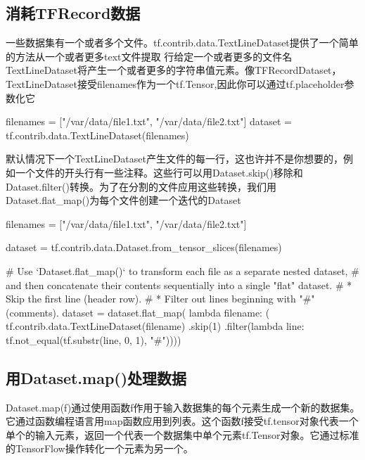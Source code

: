 \subsection{消耗TFRecord数据}
一些数据集有一个或者多个文件。tf.contrib.data.TextLineDataset提供了一个简单的方法从一个或者更多text文件提取
行给定一个或者更多的文件名TextLineDataset将产生一个或者更多的字符串值元素。像TFRecordDataset，TextLineDataset接受filenames作为一个tf.Tensor,因此你可以通过tf.placeholder参数化它
\begin{python}
filenames = ["/var/data/file1.txt", "/var/data/file2.txt"]
dataset = tf.contrib.data.TextLineDataset(filenames)
\end{python}
默认情况下一个TextLineDataset产生文件的每一行，这也许并不是你想要的，例如一个文件的开头行有一些注释。这些行可以用Dataset.skip()移除和Dataset.filter()转换。为了在分割的文件应用这些转换，我们用Dataset.flat\_map()为每个文件创建一个迭代的Dataset
\begin{python}
filenames = ["/var/data/file1.txt", "/var/data/file2.txt"]

dataset = tf.contrib.data.Dataset.from_tensor_slices(filenames)

# Use `Dataset.flat\_map()` to transform each file as a separate nested dataset,
# and then concatenate their contents sequentially into a single "flat" dataset.
# * Skip the first line (header row).
# * Filter out lines beginning with "#" (comments).
dataset = dataset.flat_map(
    lambda filename: (
        tf.contrib.data.TextLineDataset(filename)
        .skip(1)
        .filter(lambda line: tf.not_equal(tf.substr(line, 0, 1), "#"))))
\end{python}
\subsection{用Dataset.map()处理数据}
Dataset.map(f)通过使用函数f作用于输入数据集的每个元素生成一个新的数据集。它通过函数编程语言用map函数应用到列表。这个函数f接受tf.tensor对象代表一个单个的输入元素，返回一个代表一个数据集中单个元素tf.Tensor对象。它通过标准的TensorFlow操作转化一个元素为另一个。
